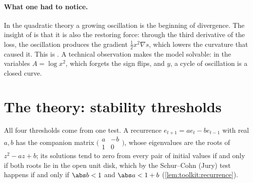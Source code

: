\begin{refsection}
\paragraph{What one had to notice.} In the quadratic theory a growing oscillation is the beginning of divergence. The insight of \textcite{DamianNichaniLee2023} is that it is also the restoring force: through the third derivative of the loss, the oscillation produces the gradient $\frac12x^2\nabla s$, which lowers the curvature that caused it. This is . A technical observation makes the model solvable: in the variables $A=\log x^2$, which forgets the sign flips, and $y$, a cycle of oscillation is a closed curve.

\section{The theory: stability thresholds}\label{sec:eos:thresholds}

All four thresholds come from one test. A recurrence $e_{t+1}=ae_t-be_{t-1}$ with real $a,b$ has the companion matrix $\bigl(\begin{smallmatrix}a&-b\\1&0\end{smallmatrix}\bigr)$, whose eigenvalues are the roots of $z^2-az+b$; its solutions tend to zero from every pair of initial values if and only if both roots lie in the open unit disk, which by the Schur--Cohn (Jury) test happens if and only if $\abs b<1$ and $\abs a<1+b$ (\cref{lem:toolkit:recurrence}).



\end{refsection}
